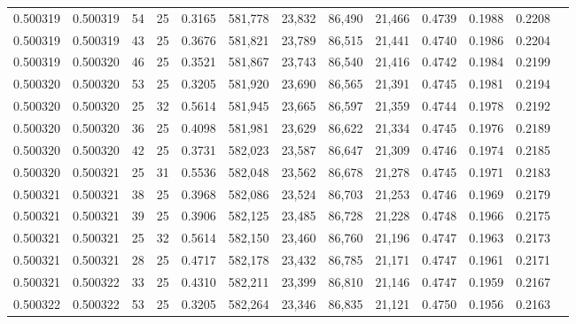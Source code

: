 \begin{tabular}{rrrrrrrrrrrrr}
0.500319 & 0.500319 &    54 &  25 &                                     0.3165 & 581,778 &  23,832 &  86,490 &  21,466 & 0.4739 & 0.1988 & 0.2208 \\
0.500319 & 0.500319 &    43 &  25 &                                     0.3676 & 581,821 &  23,789 &  86,515 &  21,441 & 0.4740 & 0.1986 & 0.2204 \\
0.500319 & 0.500320 &    46 &  25 &                                     0.3521 & 581,867 &  23,743 &  86,540 &  21,416 & 0.4742 & 0.1984 & 0.2199 \\
0.500320 & 0.500320 &    53 &  25 &                                     0.3205 & 581,920 &  23,690 &  86,565 &  21,391 & 0.4745 & 0.1981 & 0.2194 \\
0.500320 & 0.500320 &    25 &  32 &                                     0.5614 & 581,945 &  23,665 &  86,597 &  21,359 & 0.4744 & 0.1978 & 0.2192 \\
0.500320 & 0.500320 &    36 &  25 &                                     0.4098 & 581,981 &  23,629 &  86,622 &  21,334 & 0.4745 & 0.1976 & 0.2189 \\
0.500320 & 0.500320 &    42 &  25 &                                     0.3731 & 582,023 &  23,587 &  86,647 &  21,309 & 0.4746 & 0.1974 & 0.2185 \\
0.500320 & 0.500321 &    25 &  31 &                                     0.5536 & 582,048 &  23,562 &  86,678 &  21,278 & 0.4745 & 0.1971 & 0.2183 \\
0.500321 & 0.500321 &    38 &  25 &                                     0.3968 & 582,086 &  23,524 &  86,703 &  21,253 & 0.4746 & 0.1969 & 0.2179 \\
0.500321 & 0.500321 &    39 &  25 &                                     0.3906 & 582,125 &  23,485 &  86,728 &  21,228 & 0.4748 & 0.1966 & 0.2175 \\
0.500321 & 0.500321 &    25 &  32 &                                     0.5614 & 582,150 &  23,460 &  86,760 &  21,196 & 0.4747 & 0.1963 & 0.2173 \\
0.500321 & 0.500321 &    28 &  25 &                                     0.4717 & 582,178 &  23,432 &  86,785 &  21,171 & 0.4747 & 0.1961 & 0.2171 \\
0.500321 & 0.500322 &    33 &  25 &                                     0.4310 & 582,211 &  23,399 &  86,810 &  21,146 & 0.4747 & 0.1959 & 0.2167 \\
0.500322 & 0.500322 &    53 &  25 &                                     0.3205 & 582,264 &  23,346 &  86,835 &  21,121 & 0.4750 & 0.1956 & 0.2163 \\

\end{tabular}
